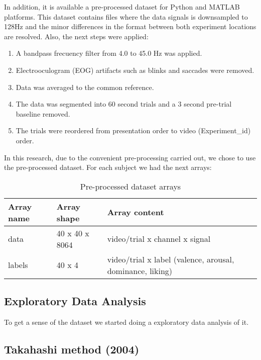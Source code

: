 \documentclass{sig-alternate}
\begin{document}
In addition, it is available a pre-processed dataset for Python and MATLAB platforms. This dataset contains files where the data signals is downsampled to 128Hz and the minor differences in the format between both experiment locations are resolved. Also, the next steps were applied:
\begin{enumerate}
\item A bandpass frecuency filter from 4.0 to 45.0 Hz was applied.
\item Electrooculogram (EOG) artifacts such as blinks and saccades were removed.
\item Data was averaged to the common reference.
\item The data was segmented into 60 second trials and a 3 second pre-trial baseline removed.
\item The trials were reordered from presentation order to video (Experiment\_id) order.
\end{enumerate} 

In this research, due to the convenient pre-processing carried out, we chose to use the pre-processed dataset. For each subject we had the next arrays:

\begin{table}[h!]
\footnotesize
\begin{center}
\begin{tabular}{|p{1cm}|p{2cm}|p{4.5cm}|}
      	\hline 
      	Array name & Array shape & Array content \\ 
      	\hline 
      	data & 40 x 40 x 8064 & video/trial x channel x signal \\ 
      	\hline
      	labels & 40 x 4 & video/trial x label (valence, arousal, dominance, liking) \\ 
      	\hline 
\end{tabular} 
\end{center}
\caption{Pre-processed dataset arrays}
\label{tab:dataset}
\end{table}       	
	
\subsection{Exploratory Data Analysis}

To get a sense of the dataset we started doing a exploratory data analysis of it. 	
	
\subsection{Takahashi method (2004)}	
\end{document}
